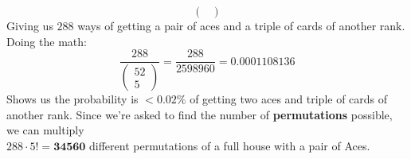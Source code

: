 \documentclass{article}
\begin{document}
\begin{enumerate}[label=\alph*)]
\begin{equation*}
\begin{pmatrix}
        \end{pmatrix}
    \end{equation*}
    Giving us \(288\) ways of getting a pair of aces and a triple of cards of another rank. Doing the math:
    \begin{equation*}
        \frac{288}{
            \begin{pmatrix}
                52 \\
                5
            \end{pmatrix}
        } = \frac{288}{2598960} = 0.0001108136
        \end{equation*}
    Shows us the probability is \(< 0.02\%\) of getting two aces and triple of cards of another rank.
    Since we're asked to find the number of \textbf{permutations} possible, we can multiply\\ 
    \(288 \cdot 5! = \textbf{34560}\) different permutations of a full house with a pair of Aces.
\end{enumerate}
\end{document}
